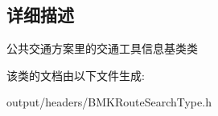 \subsection{详细描述}
公共交通方案里的交通工具信息基类类 

该类的文档由以下文件生成\+:\begin{DoxyCompactItemize}
\item 
output/headers/B\+M\+K\+Route\+Search\+Type.\+h\end{DoxyCompactItemize}
